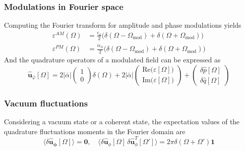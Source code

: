\subsubsection{Modulations in Fourier space}

Computing the Fourier transform for amplitude and phase modulations yields
\begin{equation}
  \begin{split}
    \varepsilon^{AM}(\Omega) & = \frac{\epsilon_a}{2} \Big(\delta(\Omega - \Omega_{\text{mod}}) +\delta(\Omega + \Omega_{\text{mod}}) \Big)\\
    \varepsilon^{PM}(\Omega) & = \frac{i\epsilon_\phi}{2} \Big(\delta(\Omega - \Omega_{\text{mod}}) + \delta(\Omega + \Omega_{\text{mod}})\Big)
  \end{split}
\end{equation}
And the quadrature operators of a modulated field can be expressed as
\begin{equation}
\mathbf{\hat{\mathbf u}} _{\bar{\varphi}} [\Omega] =2|\bar{\alpha}| \begin{pmatrix}
  1 \\ 0 
\end{pmatrix}\delta(\Omega) + 2|\bar{\alpha}|\begin{pmatrix}
  \mathrm{Re}\big(\varepsilon[\Omega] \big) \\
  \mathrm{Im}\big(\varepsilon[\Omega] \big)
\end{pmatrix}
+ \begin{pmatrix}
  \delta \hat{p}[\Omega] \\
  \delta \hat{q}[\Omega]
\end{pmatrix}
\end{equation}

\subsubsection{Vacuum fluctuations}
Considering a vacuum state or a coherent state, the expectation values of the quadrature fluctuations moments in the Fourier domain are
\begin{equation}
  \langle \delta \mathbf{\hat{u}_{\phi}}[\Omega] \rangle = \mathbf 0, \quad
\langle \delta \mathbf{\hat{\mathbf u}}_{\phi}[\Omega] \, \delta \mathbf{\hat{\mathbf u}}_{\phi}^{T}[\Omega'] \rangle = 2\pi \delta(\Omega + \Omega') \mathbf{1}
\end{equation}
